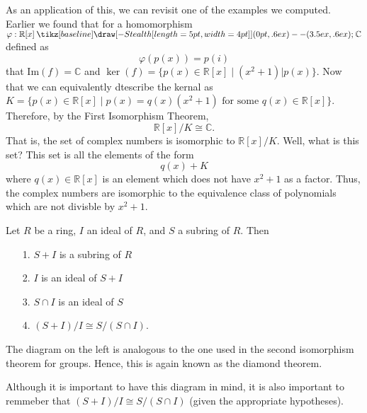 \documentclass[12pt,letterpaper]{algebra_book}
\renewcommand{\to}{\mathbin{\tikz[baseline] \draw[-{Stealth[length=5pt,width=4pt]}] (0pt,.6ex) -- (3.5ex,.6ex);}}
\newcommand{\im}{\mbox{Im}}
\newcommand{\RR}{\mathbb{R}}
\renewcommand{\phi}{\varphi}
\theoremstyle{definition}
\begin{document}
    As an application of this, we can revisit one of the examples
    we computed. Earlier we found that for a homomorphism $\phi:
    \RR[x] \to \mathbb{C}$ defined as 
    \[
        \phi(p(x)) = p(i)
    \]
    that $\im(f) = \mathbb{C}$ and $\ker(f) = \{p(x) \in \RR[x]
    \mid (x^2 + 1)\Big|p(x) \}$. Now that we can equivalently
    dtescribe the kernal as $K = \{p(x) \in \RR[x] \mid p(x) =
    q(x)(x^2 + 1) \text{ for some } q(x) \in \RR[x]\}$. Therefore,
    by the First Isomorphism Theorem,
    \[
        \RR[x]/K \cong \mathbb{C}.
    \]
    That is, the set of complex numbers is isomorphic to
    $\RR[x]/K$. Well, what is this set? This set is all the
    elements of the form 
    \[
        q(x) + K 
    \] 
    where $q(x) \in \RR[x]$ is an element which does not have $x^2
    + 1$ as a factor. Thus, the complex numbers are isomorphic to
    the equivalence class of polynomials which are not divisble by
    $x^2 + 1$.

    \begin{thm}
        Let $R$ be a ring, $I$ an ideal of $R$, and $S$ a subring
        of $R$. Then 
        \begin{itemize}
            \item[1.] $S + I$ is a subring of $R$ 
            \item[2.] $I$ is an ideal of $S + I$
            \item[3.] $S \cap I$ is an ideal of $S$
            \item[4.] $(S + I)/I \cong S/(S \cap I)$.
        \end{itemize}
    \end{thm}

    \begin{minipage}{0.25 \textwidth}
        \begin{figure}[H]
        \end{figure}
    \end{minipage} \hfill
    \begin{minipage}{0.7\textwidth}
        The diagram on the left is analogous to the one used in
        the second isomorphism theorem for groups. Hence, this is
        again known as the diamond theorem. 
        
        Although it is
        important to have this diagram in mind, it is also
        important to remmeber that $(S + I)/I \cong S/(S\cap I)$
        (given the appropriate hypotheses).
    \end{minipage}  
\end{document}

